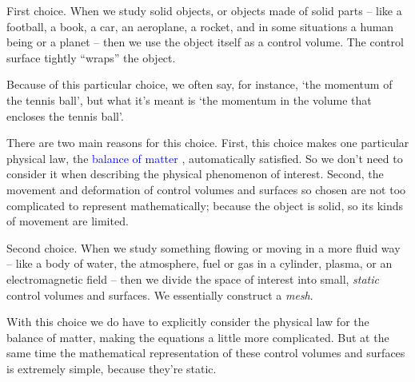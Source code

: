 \documentclass[a4paper,12pt,%
onecolumn,oneside,%
british%
]{memoir}
\renewcommand*{\|}[1][]{\nonscript\:#1\vert\nonscript\:\mathopen{}}
\newcommand*{\sect}{\S}%
\renewcommand*{\autoref}[3][\sect\,\ref]{\textcolor{blue}{#3}
\raisebox{0.6ex}{\color{blue}\miniscule%
\faIcon{angle-right}%
\;#1{#2}\;p.\,\pageref{#2}}}
\begin{document}
\medskip

First choice. When we study solid objects, or objects made of solid parts -- like a football, a book, a car, an aeroplane, a rocket, and in some situations a human being or a planet -- then we use the object itself as a control volume. The control surface tightly \enquote{wraps} the object.

Because of this particular choice, we often say, for instance, \enquote*{the momentum of the tennis ball}, but what it's meant is \enquote*{the momentum in the volume that encloses the tennis ball}.

There are two main reasons for this choice. First, this choice makes one particular physical law, the \autoref{cha:cons_matter}{balance of matter}, automatically satisfied. So we don't need to consider it when describing the physical phenomenon of interest. Second, the movement and deformation of control volumes and surfaces so chosen are not too complicated to represent mathematically; because the object is solid, so its kinds of movement are limited.

\medskip

Second choice. When we study something flowing or moving in a more fluid way -- like a body of water, the atmosphere, fuel or gas in a cylinder, plasma, or an electromagnetic field -- then we divide the space of interest into small, \emph{static} control volumes and surfaces. We essentially construct a \emph{mesh}.

With this choice we do have to explicitly consider the physical law for the balance of matter, making the equations a little more complicated. But at the same time the mathematical representation of these control volumes and surfaces is extremely simple, because they're static.

\medskip
\end{document}
